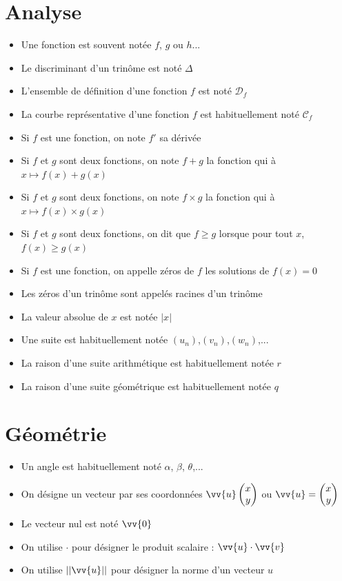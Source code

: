 \section*{Analyse}
\begin{itemize}
\item Une fonction est souvent notée $f$, $g$ ou $h$...
\item Le discriminant d'un trinôme est noté $\Delta$
\item L'ensemble de définition d'une fonction $f$ est noté $\mathscr{D}_f$
\item La courbe représentative d'une fonction $f$ est habituellement noté $\mathscr{C}_f$
\item Si $f$ est une fonction, on note $f'$ sa dérivée
\item Si $f$ et $g$ sont deux fonctions, on note $f+g$ la fonction qui à $x\mapsto f(x)+g(x)$
\item Si $f$ et $g$ sont deux fonctions, on note $f\times g$ la fonction qui à $x\mapsto f(x)\times g(x)$
\item Si $f$ et $g$ sont deux fonctions, on dit que $f \geq g$ lorsque pour tout $x$, $f(x) \geq g(x)$
\item Si $f$ est une fonction, on appelle zéros de $f$ les solutions de $f(x) = 0$
\item Les zéros d'un trinôme sont appelés racines d'un trinôme
\item La valeur absolue de $x$ est notée $|x|$
\item Une suite est habituellement notée $(u_n)$,$(v_n)$,$(w_n)$,...
\item La raison d'une suite arithmétique est habituellement notée $r$
\item La raison d'une suite géométrique est habituellement notée $q$
\end{itemize}
\section*{Géométrie}
\begin{itemize}
\item Un angle est habituellement noté $\alpha$, $\beta$, $\theta$,...
\item On désigne un vecteur par ses coordonnées $\vv{u} \covec{x}{y}$ ou $\vv{u} = \covec{x}{y}$
\item Le vecteur nul est noté $\vv{0}$
\item On utilise $\cdot$ pour désigner le produit scalaire : $\vv{u} \cdot \vv{v}$
\item On utilise $||\vv{u}||$ pour désigner la norme d'un vecteur $u$
\end{itemize}
